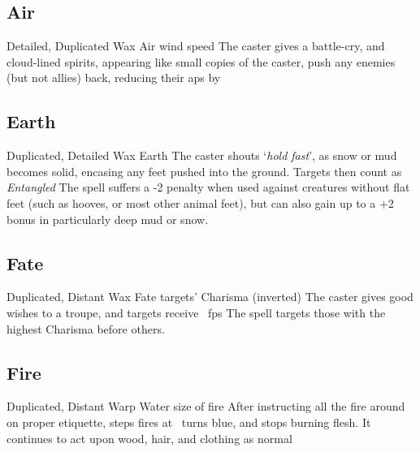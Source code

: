 \begin{multicols}{2}

\subsection{Air}

  {Detailed, Duplicated}%
  {Wax}%
  {Air}%
  {wind speed}%
  {The caster gives a battle-cry, and cloud-lined spirits, appearing like small copies of the caster, push any enemies (but not allies) back, reducing their \glspl{ap} by }%
  {}


\subsection{Earth}

  {Duplicated, Detailed}%
  {Wax}%
  {Earth}%
  {}%
  {The caster shouts `\textit{hold fast}', as snow or mud becomes solid, encasing any feet pushed into the ground.
  Targets then count as \textit{Entangled}}%
  {
  The spell suffers a -2 penalty when used against creatures without flat feet (such as hooves, or most other animal feet), but can also gain up to a +2 bonus in particularly deep mud or snow.}


\subsection{Fate}

  {Duplicated, Distant}%
  {Wax}%
  {Fate}%
  {targets' Charisma (inverted)}%
  {The caster gives good wishes to a troupe, and  targets receive \showDam~\glspl{fp}}%
  {The spell targets those with the highest Charisma before others.}


\subsection{Fire}


  {Duplicated, Distant}%
  {Warp}%
  {Water}%
  {size of fire}%
  {After instructing all the fire around on proper etiquette,  \glspl{step} fires at \spellRange\ turns blue, and stops burning flesh.
  It continues to act upon wood, hair, and clothing as normal}%
  {}


\end{multicols}
